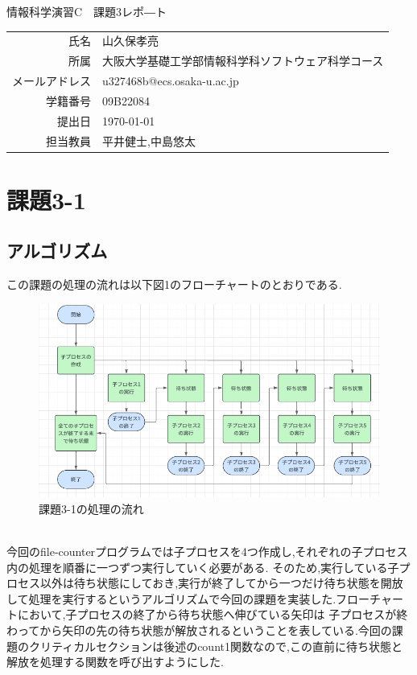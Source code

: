 \documentclass[dvipdfmx]{jarticle}
\begin{document}
\begin{titlepage}
    \begin{center}
        {\huge 情報科学演習C　課題3レポ―ト}
        \vspace{180pt}\\
        \begin{tabular}{rl}
            氏名 & 山久保孝亮\\
            所属 & 大阪大学基礎工学部情報科学科ソフトウェア科学コース\\
            メールアドレス & u327468b@ecs.osaka-u.ac.jp\\
            学籍番号 & 09B22084\\
            提出日 & \today\\
            担当教員 & 平井健士,中島悠太
        \end{tabular}
    \end{center}
\end{titlepage}
\section{課題3-1}
\subsection{アルゴリズム}
この課題の処理の流れは以下図1のフローチャートのとおりである.
\begin{figure}[h]
    \centering
    \includegraphics[width=12cm]{3-1hurotya.png}
    \caption{課題3-1の処理の流れ}
\end{figure}
\\
今回のfile-counterプログラムでは子プロセスを4つ作成し,それぞれの子プロセス内の処理を順番に一つずつ実行していく必要がある.
そのため,実行している子プロセス以外は待ち状態にしておき,実行が終了してから一つだけ待ち状態を開放して処理を実行するというアルゴリズムで今回の課題を実装した.フローチャートにおいて,子プロセスの終了から待ち状態へ伸びている矢印は
子プロセスが終わってから矢印の先の待ち状態が解放されるということを表している.今回の課題のクリティカルセクションは後述のcount1関数なので,この直前に待ち状態と解放を処理する関数を呼び出すようにした.
\end{document}
